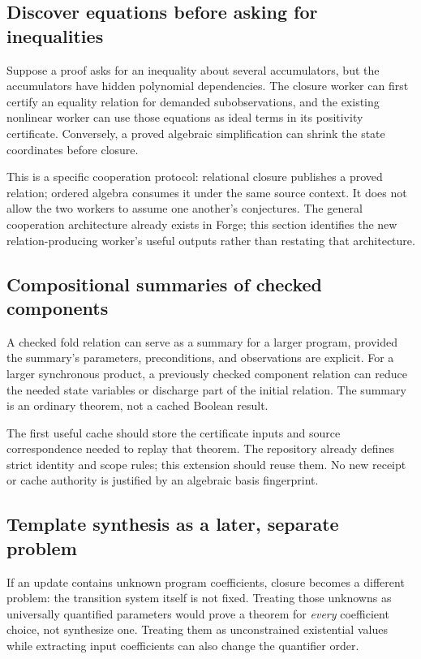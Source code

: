 \documentclass[11pt,letterpaper]{article}
\theoremstyle{definition}
\begin{document}
\subsection{Discover equations before asking for inequalities}
Suppose a proof asks for an inequality about several accumulators, but the
accumulators have hidden polynomial dependencies. The closure worker can first
certify an equality relation for demanded subobservations, and the existing
nonlinear worker can use those equations as ideal terms in its positivity
certificate. Conversely, a proved algebraic simplification can shrink the state
coordinates before closure.

This is a specific cooperation protocol: relational closure publishes a proved
relation; ordered algebra consumes it under the same source context. It does
not allow the two workers to assume one another's conjectures. The general
cooperation architecture already exists in Forge; this section identifies the
new relation-producing worker's useful outputs rather than restating that
architecture.

\subsection{Compositional summaries of checked components}
A checked fold relation can serve as a summary for a larger program, provided
the summary's parameters, preconditions, and observations are explicit. For a
larger synchronous product, a previously checked component relation can reduce
the needed state variables or discharge part of the initial relation. The
summary is an ordinary theorem, not a cached Boolean result.

The first useful cache should store the certificate inputs and source
correspondence needed to replay that theorem. The repository already defines
strict identity and scope rules; this extension should reuse them. No new
receipt or cache authority is justified by an algebraic basis fingerprint.

\subsection{Template synthesis as a later, separate problem}
If an update contains unknown program coefficients, closure becomes a different
problem: the transition system itself is not fixed. Treating those unknowns as
universally quantified parameters would prove a theorem for \emph{every}
coefficient choice, not synthesize one. Treating them as unconstrained existential
values while extracting input coefficients can also change the quantifier order.
\end{document}
